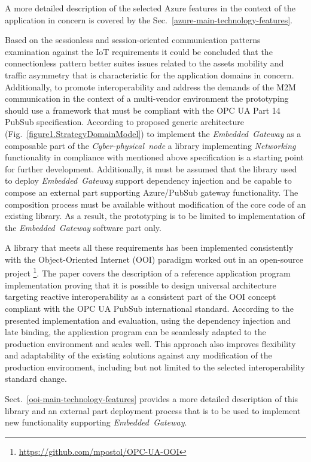 \documentclass[runningheads]{llncs}
\begin{document}
A more detailed description of the selected Azure features in the context of the application in concern is covered by the Sec.~\ref{azure-main-technology-features}.

Based on the sessionless and session-oriented communication patterns examination against the IoT requirements \cite{mpostol2020} it could be concluded that the connectionless pattern better suites issues related to the assets mobility and traffic asymmetry that is characteristic for the application domains in concern. Additionally, to promote interoperability and address the demands of the M2M communication in the context of a multi-vendor environment the prototyping should use a framework that must be compliant with the OPC UA Part 14 PubSub  specification. According to proposed generic architecture (Fig.~\ref{figure1.StrategyDomainModel}) to implement the \emph{Embedded\ Gateway} as a composable part of the \emph{Cyber-physical\ node} a library implementing \emph{Networking} functionality in compliance with mentioned above specification is a starting point for further development. Additionally, it must be assumed that the library used to deploy \emph{Embedded\ Gateway} support dependency injection and be capable to compose an external part supporting Azure/PubSub gateway functionality. The composition process must be available without modification of the core code of an existing library. As a result, the prototyping is to be limited to implementation of the \emph{Embedded\ Gateway} software part only.

A library that meets all these requirements has been implemented consistently with the Object-Oriented Internet (OOI) paradigm \cite{mariusz_postol_2020_4361640} worked out in an open-source project \footnote{ \url{https://github.com/mpostol/OPC-UA-OOI} }. The paper \cite{mpostol2020} covers the description of a reference application program implementation proving that it is possible to design universal architecture targeting reactive interoperability as a consistent part of the OOI concept compliant with the OPC UA PubSub international standard. According to the presented implementation and evaluation, using the dependency injection and late binding, the application program can be seamlessly adapted to the production environment and scales well. This approach also improves flexibility and adaptability of the existing solutions against any modification of the production environment, including but not limited to the selected interoperability standard change.

Sect.~\ref{ooi-main-technology-features} provides a more detailed description of this library and an external part deployment process that is to be used to implement new functionality supporting \emph{Embedded\ Gateway}.
\end{document}
